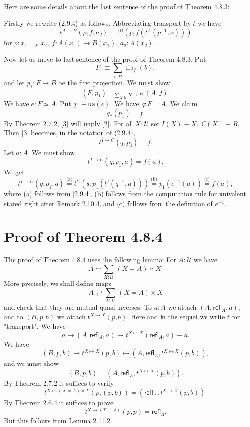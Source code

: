 \documentclass[12pt]{article}
\newcommand{\oo}{\operatorname}
\newcommand{\refl}{\mathsf{refl}}
\newcommand{\U}{\mathcal U}
\newcommand{\ua}{\mathsf{ua}}
\begin{document}
Here are some details about the last sentence of the proof of Theorem 4.8.3:

Firstly we rewrite (2.9.4) as follows. Abbreviating transport by $t$ we have 
\begin{equation}\label{2.9.4}
t^{A\to B}(p,f,a_2)=t^B(p,f(t^A(p^{-1},x)))
\end{equation}
for $p:x_1=_Xx_2,\ f:A(x_1)\to B(x_1),\ a_2:A(x_2)$. 

Now let us move to last sentence of the proof of Theorem 4.8.3. Put
$$
F:\equiv\sum_{b:B}\oo{fib}_f(b),
$$ 
and let $p_1:F\to B$ be the first projection. We must show 
\begin{equation}\label{2}
(F,p_1)=_{\sum_{X:\U}X\to B}(A,f).
\end{equation} 
We have $e:F\simeq A$. Put $q:\equiv\ua(e)$. We have $q:F=A$. We claim 
\begin{equation}\label{3}
q_*(p_1)=f.
\end{equation} 
By Theorem 2.7.2, \eqref{3} will imply \eqref{2}. For all $X:\U$ set $I(X)\equiv X,\ C(X)\equiv B$. Then \eqref{3} becomes, in the notation of (2.9.4), 
$$
t^{I\to C}(q,p_1)=f.
$$ 
Let $a:A$. We must show 
$$
t^{I\to C}(q,p_1,a)=f(a).
$$ 
We get 
$$
t^{I\to C}(q,p_1,a)\overset{\text{(a)}}=t^C(q,p_1(t^I(q^{-1},a)))\overset{\text{(b)}}=p_1(e^{-1}(a))\overset{\text{(c)}}=f(a),
$$ 
where (a) follows from \eqref{2.9.4}, (b) follows from the computation rule for univalent stated right after Remark 2.10.4, and (c) follows from the definition of $e^{-1}$.


\section{Proof of Theorem 4.8.4}

The proof of Theorem 4.8.4 uses the following lemma: For $A:\U$ we have 
$$
A\simeq\sum_{X:\U}\ (X=A)\times X.
$$
More precisely, we shall define maps 
$$
A\rightleftarrows\sum_{X:\U}\ (X=A)\times X
$$ 
and check that they are mutual quasi-inverses. To $a:A$ we attach $(A,\refl_A,a)$, and to $(B,p,b)$ we attach $t^{X\mapsto X}(p,b)$. Here and in the sequel we write $t$ for "transport". We have 
$$
a\mapsto(A,\refl_A,a)\mapsto t^{X\mapsto X}(\refl_A,a)\equiv a.
$$ 
We have 
$$
(B,p,b)\mapsto t^{X\mapsto X}(p,b)\mapsto(A,\refl_A,t^{X\mapsto X}(p,b)),
$$ 
and we must show 
$$
(B,p,b)=(A,\refl_A,t^{X\mapsto X}(p,b)).
$$ 
By Theorem 2.7.2 it suffices to verify 
$$
t^{X\mapsto (X=A)\times X}(p,(p,b))=(\refl_A,t^{X\mapsto X}(p,b)).
$$ 
By Theorem 2.6.4 it suffices to prove 
$$
t^{X\mapsto (X=A)}(p,p)=\refl_A.
$$ 
But this follows from Lemma 2.11.2.
\end{document}

